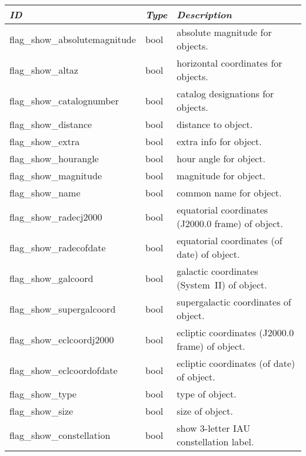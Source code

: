 \begin{longtabu} to \textwidth {l|l|X}\toprule
\emph{ID} & \emph{Type} & \emph{Description}\\\midrule
flag\_show\_absolutemagnitude & bool & absolute magnitude for objects.\\\midrule
flag\_show\_altaz             & bool & horizontal coordinates for objects.\\\midrule
flag\_show\_catalognumber     & bool & catalog designations for objects.\\\midrule
flag\_show\_distance          & bool & distance to object.\\\midrule
flag\_show\_extra             & bool & extra info for object.\\\midrule
flag\_show\_hourangle         & bool & hour angle for object.\\\midrule
flag\_show\_magnitude         & bool & magnitude for object.\\\midrule
flag\_show\_name              & bool & common name for object.\\\midrule
flag\_show\_radecj2000        & bool & equatorial coordinates (J2000.0 frame) of object.\\\midrule
flag\_show\_radecofdate       & bool & equatorial coordinates (of date) of object.\\\midrule
flag\_show\_galcoord          & bool & galactic coordinates (System~II) of object.\\\midrule
flag\_show\_supergalcoord     & bool & supergalactic coordinates of object.\\\midrule
flag\_show\_eclcoordj2000     & bool & ecliptic coordinates (J2000.0 frame) of object.\\\midrule
flag\_show\_eclcoordofdate    & bool & ecliptic coordinates (of date) of object.\\\midrule
flag\_show\_type              & bool & type of object.\\\midrule
flag\_show\_size              & bool & size of object.\\\midrule
flag\_show\_constellation     & bool & show 3-letter IAU constellation label.\\\bottomrule
\end{longtabu}


\subsection{}
\label{sec:config.ini:custom_time_correction}

